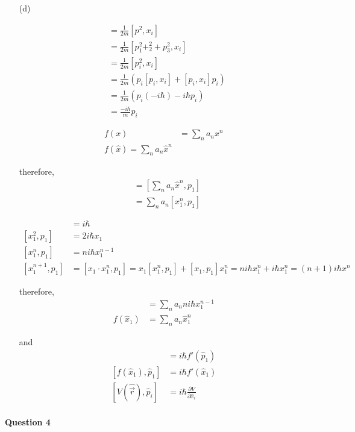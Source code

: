 \documentclass[11pt,a4paper]{article}
\begin{document}
\begin{enumerate}
\item[(d)]

\begin{align}
[\frac{p^2}{2m},x_i]&=\frac{1}{2m}[p^2,x_i]\\
&=\frac{1}{2m}[p_1^2+_2^2+p_3^2,x_i]\\
&=\frac{1}{2m}[p_i^2,x_i]\\
&=\frac{1}{2m}(p_i[p_i,x_i]+[p_i,x_i]p_i)\\
&=\frac{1}{2m}(p_i(-i\hbar)-i\hbar p_i)\\
&=\frac{-i\hbar}{m}p_i
\end{align}

\begin{align}
f(x)&=\sum_n a_n x^n\\
f(\hat{x})=\sum_n a_n \hat{x}^n
\end{align}

therefore,
\begin{align}
[f(\hat{x}),p_1]&=[\sum_n a_n \hat{x}^n,p_1]\\
&=\sum_n a_n [x_1^n,p_1]
\end{align}

\begin{align}
[x_1,p_1]&=i\hbar\\
[x_1^2,p_1]&=2i\hbar x_1\\
[x_1^n,p_1]&=ni\hbar x_1^{n-1}\\
[x_1^{n+1},p_1]&=[x_1\cdot x_1^n,p_1]=x_1[x_1^n,p_1]+[x_1,p_1]x_1^n=ni\hbar x_1^n+i\hbar x_1^n=(n+1)i\hbar x^n
\end{align}

\newpage

therefore,
\begin{align}
&=\sum_n a_nni\hbar x_1^{n-1}\\
f(\hat{x}_1)&=\sum_n a_n\hat{x}_1^n
\end{align}

and
\begin{align}
[\hat{x}_1,f(\hat{x}_1)]&=i\hbar f'(\hat{p}_1)\\
[f(\hat{x}_1),\hat{p}_1]&=i\hbar f'(\hat{x}_1)\\
[V(\hat{\vec{r}}),\hat{p}_i]&=i\hbar\frac{\partial V}{\partial \hat{x}_i}
\end{align}

\end{enumerate}

\newpage

\paragraph{Question 4}
\end{document}
